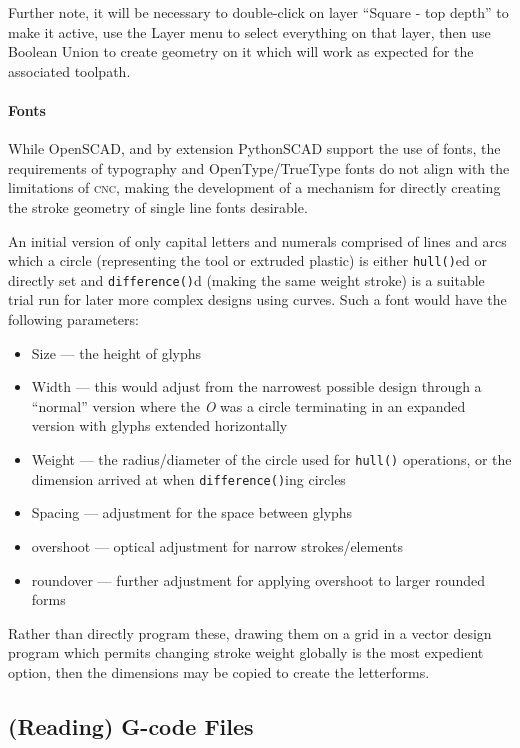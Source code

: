 \documentclass{ltxdoc}
\begin{document}
\noindent Further note, it will be necessary to double-click on layer ``Square - top depth'' to make it active, use the Layer menu to select everything on that layer, then use Boolean Union to create geometry on it which will work as expected for the associated toolpath.

\paragraph{Fonts}

While OpenSCAD, and by extension PythonSCAD support the use of fonts, the requirements of typography and OpenType/TrueType fonts do not align with the limitations of \textsc{cnc}, making the development of a mechanism for directly creating the stroke geometry of single line fonts desirable.

An initial version of only capital letters and numerals comprised of lines and arcs which a circle (representing the tool or extruded plastic) is either \verb|hull()|ed or directly set and \verb|difference()|d (making the same weight stroke) is a suitable trial run for later more complex designs using curves. Such a font would have the following parameters:

\begin{itemize}
\item Size --- the height of glyphs
\item Width --- this would adjust from the narrowest possible design through a ``normal'' version where the \emph{O} was a circle terminating in an expanded version with glyphs extended horizontally
\item Weight --- the radius/diameter of the circle used for \verb|hull()| operations, or the dimension arrived at when \verb|difference()|ing circles
\item Spacing --- adjustment for the space between glyphs
\item overshoot --- optical adjustment for narrow strokes/elements
\item roundover --- further adjustment for applying overshoot to larger rounded forms 
\end{itemize}

Rather than directly program these, drawing them on a grid in a vector design program which permits changing stroke weight globally is the most expedient option, then the dimensions may be copied to create the letterforms.

\subsection{(Reading) G-code Files}
\end{document}
